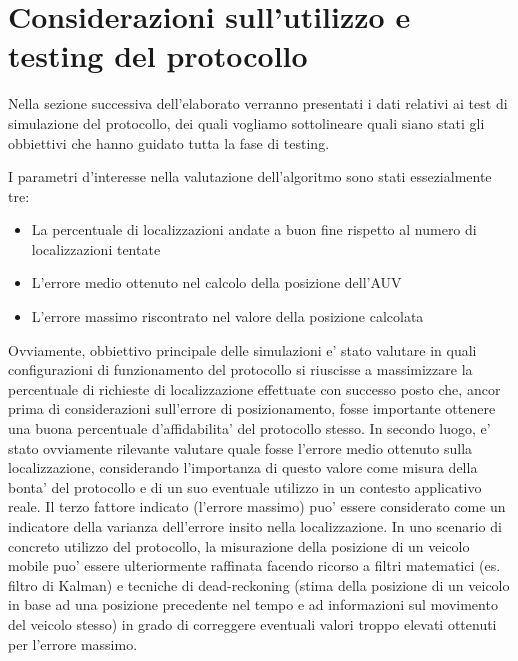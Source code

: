 \section{Considerazioni sull'utilizzo e testing del protocollo}
\par
Nella sezione successiva dell'elaborato verranno presentati i dati relativi ai test di simulazione del protocollo, dei quali vogliamo sottolineare quali siano stati gli obbiettivi che hanno guidato tutta la fase di testing.
\par
I parametri d'interesse nella valutazione  dell'algoritmo sono stati essezialmente tre:
\begin{itemize}
\item La percentuale di localizzazioni andate a buon fine rispetto al numero di localizzazioni tentate
\item L'errore medio ottenuto nel calcolo della posizione dell'AUV
\item L'errore massimo riscontrato nel valore della posizione calcolata
\end{itemize}
Ovviamente, obbiettivo principale delle simulazioni e' stato valutare in quali configurazioni di funzionamento del protocollo si riuscisse a massimizzare la percentuale di richieste di localizzazione effettuate con successo posto che, ancor prima di considerazioni sull'errore di posizionamento, fosse importante ottenere una buona percentuale d'affidabilita' del protocollo stesso.  In secondo luogo, e' stato ovviamente rilevante valutare quale fosse l'errore medio ottenuto sulla localizzazione, considerando l'importanza di questo valore come misura della bonta' del protocollo e di un suo eventuale utilizzo in un contesto applicativo reale. Il terzo fattore indicato (l'errore massimo) puo' essere considerato come un indicatore della varianza dell'errore insito nella localizzazione. In uno scenario di concreto utilizzo del protocollo, la misurazione della posizione di un veicolo mobile puo' essere ulteriormente raffinata facendo ricorso a filtri matematici (es. filtro di Kalman) e tecniche di dead-reckoning (stima della posizione  di un veicolo in base ad una posizione precedente nel tempo e ad informazioni sul movimento del veicolo stesso) in grado di correggere eventuali valori troppo elevati ottenuti per l'errore massimo.

